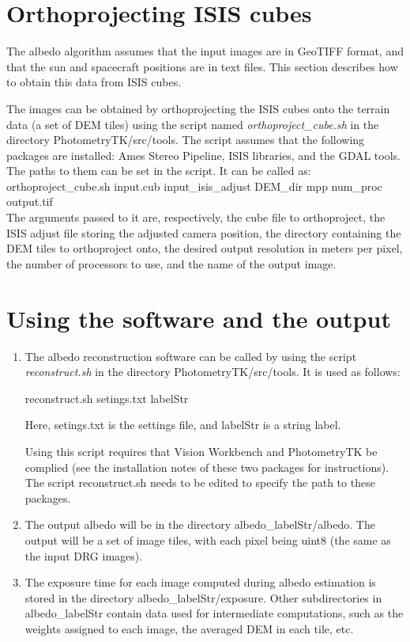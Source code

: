 \documentclass{article}
\begin{document}
\section{Orthoprojecting ISIS cubes}

The albedo algorithm assumes that the input images are in GeoTIFF
format, and that the sun and spacecraft positions are in text files.
This section describes how to obtain this data from ISIS cubes.

The images can be obtained by orthoprojecting the ISIS cubes 
onto the terrain data (a set of DEM tiles) using the script named {\it orthoproject\_cube.sh} in
the directory PhotometryTK/src/tools. The script assumes that the following packages
are installed: Ames Stereo Pipeline, ISIS libraries, and the GDAL
tools. The paths to them can be set in the script. It can be called
as: \\

orthoproject\_cube.sh input.cub input\_isis\_adjust DEM\_dir mpp num\_proc output.tif \\

The arguments passed to it are, respectively, the cube file to
orthoproject, the ISIS adjust file storing the adjusted camera
position, the directory containing the DEM tiles to orthoproject onto, the desired output resolution in meters per pixel, the
number of processors to use, and the name of the output image.

\section{Using the software and the output}

\begin{enumerate}

\item The albedo reconstruction software can be called by using the
  script {\it reconstruct.sh} in the directory PhotometryTK/src/tools. It is
  used as follows:

reconstruct.sh setings.txt labelStr

Here, setings.txt is the settings file, and labelStr is a
string label.

Using this script requires that Vision Workbench and PhotometryTK be
complied (see the installation notes of these two packages for
instructions). The script reconstruct.sh needs to be edited to specify the 
path to these packages.

\item The output albedo will be in the directory
  albedo\_labelStr/albedo. The output will be a set of image tiles, with each
  pixel being uint8 (the same as the input DRG images).

\item The exposure time for each image computed during albedo estimation is
  stored in the directory albedo\_labelStr/exposure. Other subdirectories
 in albedo\_labelStr contain data used for intermediate computations,
 such as the weights assigned to each image, the averaged DEM in each
 tile, etc.

\end{enumerate}
\end{document}
